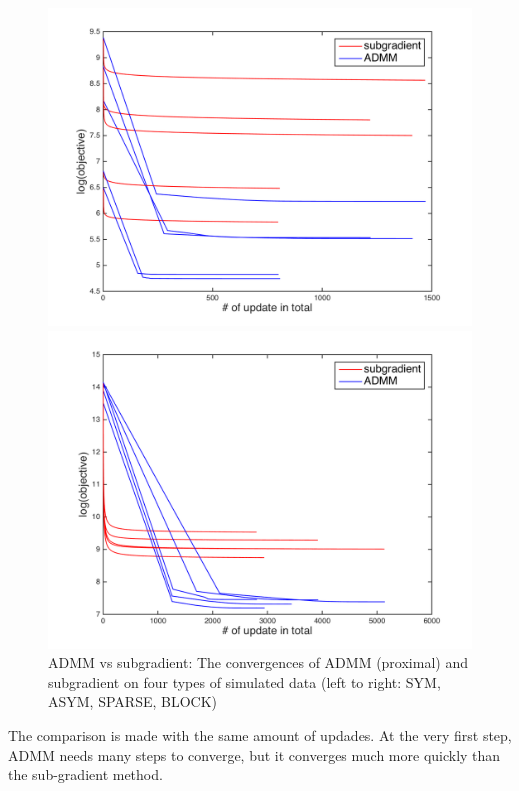 \documentclass{article}
\begin{document}
\begin{figure}[ht!]
\begin{minipage}{0.24\textwidth}
    \centering
    \includegraphics[width=1\textwidth]{../yanyu_code/plots/sparse_subgrad_p10}
  \end{minipage}
  \hfill
  \begin{minipage}{0.24\textwidth}
    \centering
    \includegraphics[width=1\textwidth]{../yanyu_code/plots/block_subgrad_p10}
  \end{minipage}
  \caption{ADMM vs subgradient: The convergences of ADMM (proximal) and subgradient on four types of simulated data (left to right: SYM, ASYM, SPARSE, BLOCK)}
  \label{fig:subgrad}
\end{figure}
The comparison is made with the same amount of updades. At the very first step, ADMM needs many steps to converge, but it converges much more quickly than the sub-gradient method.
\end{document}
